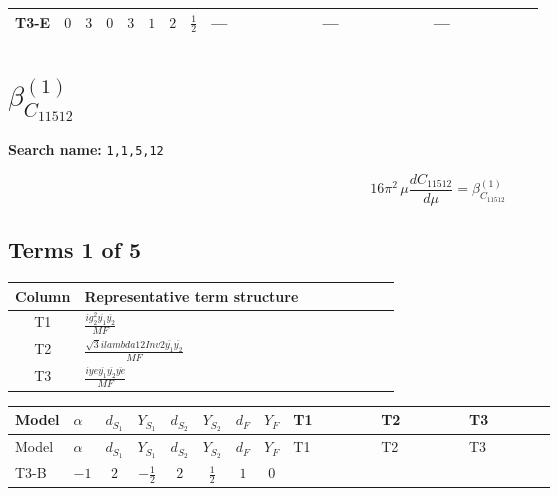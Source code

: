 \documentclass[8pt]{article}
\begin{document}
\begin{landscape}
\begin{longtable}{@{}llcccccc >{\raggedright\arraybackslash}p{0.21\linewidth} >{\raggedright\arraybackslash}p{0.21\linewidth} >{\raggedright\arraybackslash}p{0.21\linewidth}@{}}
\midrule
T3-E & $0$ & $3$ & $0$ & $3$ & $1$ & $2$ & $\frac{1}{2}$ & --- & --- & --- \\
\midrule
\bottomrule
\end{longtable}
\clearpage
\section*{$\beta_{C_{11512}}^{(1)}$}
\noindent\textbf{Search name: }\texttt{1,1,5,12}\par\smallskip
\[16\pi^2\,\mu\frac{d C_{11512}}{d\mu}=\beta_{C_{11512}}^{(1)}\]
\subsection*{Terms 1 of 5}
\begin{center}
\begin{tabular}{@{}c >{\raggedright\arraybackslash}p{0.82\linewidth}@{}}
\toprule
Column & Representative term structure \\
\midrule
T1 & \(\displaystyle \frac{i g_{2}^{2} \overline{y_{1}} \overline{y_{2}}}{MF}\) \\
\midrule
T2 & \(\displaystyle \frac{\sqrt{3} i lambda12Inv2 \overline{y_{1}} \overline{y_{2}}}{MF}\) \\
\midrule
T3 & \(\displaystyle \frac{i ye \overline{y_{1}} \overline{y_{2}} \overline{ye}}{MF}\) \\
\midrule
\bottomrule
\end{tabular}
\end{center}
\smallskip
\tiny
\begin{longtable}{@{}llcccccc >{\raggedright\arraybackslash}p{0.21\linewidth} >{\raggedright\arraybackslash}p{0.21\linewidth} >{\raggedright\arraybackslash}p{0.21\linewidth}@{}}
\toprule
Model & $\alpha$ & $d_{S_1}$ & $Y_{S_1}$ & $d_{S_2}$ & $Y_{S_2}$ & $d_F$ & $Y_F$ & T1 & T2 & T3 \\
\midrule
\endfirsthead
\toprule
Model & $\alpha$ & $d_{S_1}$ & $Y_{S_1}$ & $d_{S_2}$ & $Y_{S_2}$ & $d_F$ & $Y_F$ & T1 & T2 & T3 \\
\midrule
\endhead
T3-B & $-1$ & $2$ & $-\frac{1}{2}$ & $2$ & $\frac{1}{2}$ & $1$ & $0$ & \scriptsize\adjustbox{max width=\linewidth}{$\begin{gathered} - \frac{3 i g_{2}^{2} \overline{y_{1}} \overline{y_{2}}}{4 MF}\end{gathered}$} & \scriptsize\adjustbox{max width=\linewidth}{$\begin{gathered} - \frac{\sqrt{3} i lambda12Inv2 \overline{y_{1}} \overline{y_{2}}}{3 MF}\end{gathered}$} & \scriptsize\adjustbox{max width=\linewidth}{$\begin{gathered} \frac{i ye \overline{y_{1}} \overline{y_{2}} \overline{ye}}{4 MF}\end{gathered}$} \\

\end{longtable}
\end{landscape}
\end{document}
